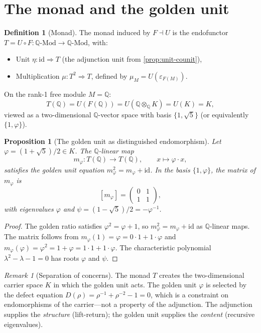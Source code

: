 \documentclass[11pt,a4paper]{article}
\theoremstyle{plain}
\newtheorem{proposition}[theorem]{Proposition}
\theoremstyle{definition}
\newtheorem{definition}[theorem]{Definition}
\theoremstyle{remark}
\newtheorem{remark}[theorem]{Remark}
\numberwithin{equation}{section}
\providecommand{\Q}{\mathbb{Q}}
\providecommand{\vp}{\varphi}
\providecommand{\ps}{\psi}
\providecommand{\id}{\mathrm{id}}
\begin{document}
\section{The monad and the golden unit}
\label{sec:golden-unit}

\begin{definition}[Monad]
\label{def:monad}
The monad induced by $F \dashv U$ is the endofunctor
$T = U \circ F \colon \Q\text{-Mod} \to \Q\text{-Mod}$, with:
\begin{itemize}
  \item Unit $\eta\colon \id \Rightarrow T$
    (the adjunction unit from \cref{prop:unit-counit}),
  \item Multiplication $\mu\colon T^2 \Rightarrow T$, defined by
    $\mu_M = U(\varepsilon_{F(M)})$.
\end{itemize}
\end{definition}

On the rank-1 free module $M = \Q$:
\[
  T(\Q) = U(F(\Q)) = U(\Q \otimes_\Q K) = U(K) = K,
\]
viewed as a two-dimensional $\Q$-vector space with basis
$\{1, \sqrt{5}\}$ (or equivalently $\{1, \vp\}$).

\begin{proposition}[The golden unit as distinguished endomorphism]
\label{prop:golden-endomorphism}
Let $\vp = (1 + \sqrt{5})/2 \in K$.  The $\Q$-linear map
\[
  m_\vp \colon T(\Q) \to T(\Q), \qquad
  x \mapsto \vp \cdot x,
\]
satisfies the golden unit equation $m_\vp^2 = m_\vp + \id$.
In the basis $\{1, \vp\}$, the matrix of $m_\vp$ is
\[
  [m_\vp] =
  \begin{pmatrix} 0 & 1 \\ 1 & 1 \end{pmatrix},
\]
with eigenvalues $\vp$ and $\ps = (1-\sqrt{5})/2 = -\vp^{-1}$.
\end{proposition}

\begin{proof}
The golden ratio satisfies $\vp^2 = \vp + 1$, so $m_\vp^2 = m_\vp
+ \id$ as $\Q$-linear maps.  The matrix follows from
$m_\vp(1) = \vp = 0 \cdot 1 + 1 \cdot \vp$ and
$m_\vp(\vp) = \vp^2 = 1 + \vp = 1 \cdot 1 + 1 \cdot \vp$.
The characteristic polynomial $\lambda^2 - \lambda - 1 = 0$ has
roots $\vp$ and $\ps$.
\end{proof}

\begin{remark}[Separation of concerns]
\label{rmk:separation}
The monad $T$ creates the two-dimensional carrier space $K$ in
which the golden unit acts.  The golden unit $\vp$ is selected by
the defect equation $D(\rho) = \rho^{-1} + \rho^{-2} - 1 = 0$,
which is a constraint on endomorphisms of the carrier---not a
property of the adjunction.  The adjunction supplies the
\emph{structure} (lift-return); the golden unit supplies the
\emph{content} (recursive eigenvalues).
\end{remark}
\end{document}
